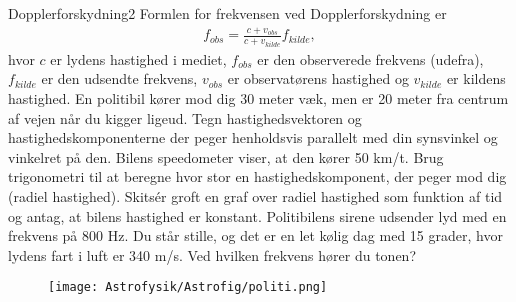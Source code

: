 \begin{opgave}{Dopplerforskydning}{2}
	Formlen for frekvensen ved Dopplerforskydning er
	\begin{align}
		f_{obs} = \frac{c+v_{obs}}{c+v_{kilde}} f_{kilde},
	\end{align}
	hvor $c$ er lydens hastighed i mediet, $f_{obs}$ er den observerede frekvens (udefra), $f_{kilde}$ er den udsendte frekvens, $v_{obs}$ er observatørens hastighed og $v_{kilde}$ er kildens hastighed.
	\opg En politibil kører mod dig 30 meter væk, men er 20 meter fra centrum af vejen når du kigger ligeud. Tegn hastighedsvektoren og hastighedskomponenterne der peger henholdsvis parallelt med din synsvinkel og vinkelret på den. 
	\opg Bilens speedometer viser, at den kører 50 km/t. Brug trigonometri til at beregne hvor stor en hastighedskomponent, der peger mod dig (radiel hastighed). Skitsér groft en graf over radiel hastighed som funktion af tid og antag, at bilens hastighed er konstant.
	\opg Politibilens sirene udsender lyd med en frekvens på 800 Hz. Du står stille, og det er en let kølig dag med 15 grader, hvor lydens fart i luft er 340 m/s. Ved hvilken frekvens hører du tonen?
	\begin{figure}[h!]
		\centering
		\texttt{[image: Astrofysik/Astrofig/politi.png]}
		\label{politi}
	\end{figure}
\end{opgave}

